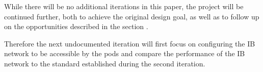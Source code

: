 While there will be no additional iterations in this paper,
the project will be continued further, both to achieve the
original design goal, as well as to follow up on the opportunities
described in the section .

Therefore the next undocumented iteration will first focus on
configuring the \ac{IB} network to be accessible by the pods and
compare the performance of the \ac{IB} network to the standard
established during the second iteration.

\pagebreak